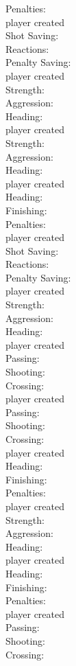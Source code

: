 \documentclass[]{article}
\begin{document}
{Penalties:\\
player created\\
Shot Saving:\\
Reactions:\\
Penalty Saving:\\
player created\\
Strength:\\
Aggression:\\
Heading:\\
player created\\
Strength:\\
Aggression:\\
Heading:\\
player created\\
Heading:\\
Finishing:\\
Penalties:\\
player created\\
Shot Saving:\\
Reactions:\\
Penalty Saving:\\
player created\\
Strength:\\
Aggression:\\
Heading:\\
player created\\
Passing:\\
Shooting:\\
Crossing:\\
player created\\
Passing:\\
Shooting:\\
Crossing:\\
player created\\
Heading:\\
Finishing:\\
Penalties:\\
player created\\
Strength:\\
Aggression:\\
Heading:\\
player created\\
Heading:\\
Finishing:\\
Penalties:\\
player created\\
Passing:\\
Shooting:\\
Crossing:\\
}
\end{document}

